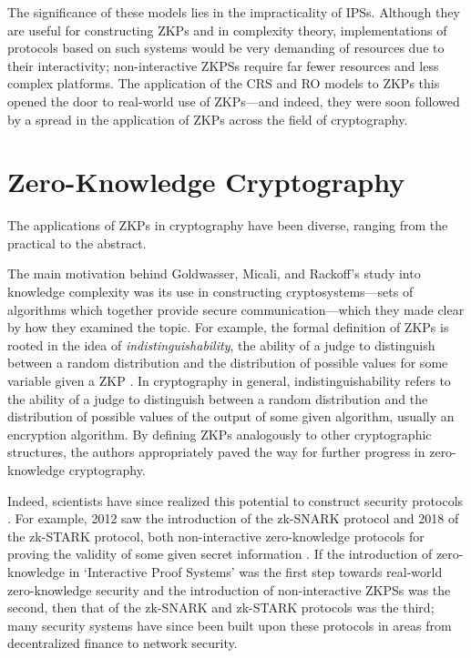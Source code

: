 \documentclass{article}
\begin{document}
\noindent The significance of these models lies in the impracticality of IPSs. Although they are useful for constructing ZKPs and in complexity theory, implementations of protocols based on such systems would be very demanding of resources due to their interactivity; non-interactive ZKPSs require far fewer resources and less complex platforms. The application of the CRS and RO models to ZKPs this opened the door to real-world use of ZKPs---and indeed, they were soon followed by a spread in the application of ZKPs across the field of cryptography.


\section{Zero-Knowledge Cryptography}

The applications of ZKPs in cryptography have been diverse, ranging from the practical to the abstract.

The main motivation behind Goldwasser, Micali, and Rackoff's study into knowledge complexity was its use in constructing cryptosystems---sets of algorithms which together provide secure communication---which they made clear by how they examined the topic. For example, the formal definition of ZKPs is rooted in the idea of \textit{indistinguishability}, the ability of a judge to distinguish between a random distribution and the distribution of possible values for some variable given a ZKP \cite{GMR}. In cryptography in general, indistinguishability refers to the ability of a judge to distinguish between a random distribution and the distribution of possible values of the output of some given algorithm, usually an encryption algorithm. By defining ZKPs analogously to other cryptographic structures, the authors appropriately paved the way for further progress in zero-knowledge cryptography.

Indeed, scientists have since realized this potential to construct security protocols \cite{GMR}. For example, 2012 saw the introduction of the zk-SNARK protocol and 2018 of the zk-STARK protocol, both non-interactive zero-knowledge protocols for proving the validity of some given secret information \cite{BGPS}. If the introduction of zero-knowledge in `Interactive Proof Systems' was the first step towards real-world zero-knowledge security and the introduction of non-interactive ZKPSs was the second, then that of the zk-SNARK and zk-STARK protocols was the third; many security systems have since been built upon these protocols in areas from decentralized finance to network security.
\end{document}
